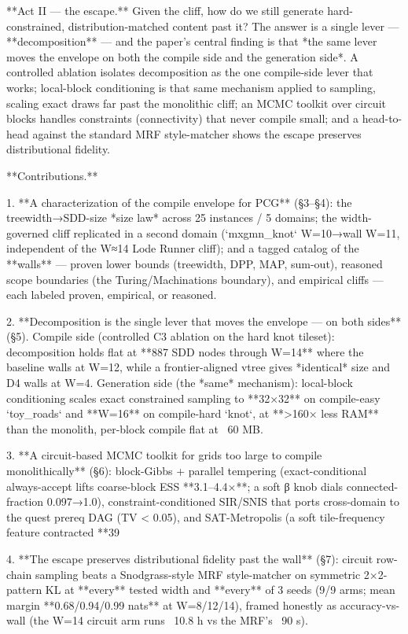 \documentclass[letterpaper]{article} %
\begin{document}
**Act II — the escape.** Given the cliff, how do we still generate hard-constrained,
distribution-matched content past it? The answer is a single lever — **decomposition** — and the
paper's central finding is that *the same lever moves the envelope on both the compile side and the
generation side*. A controlled ablation isolates decomposition as the one compile-side lever that
works; local-block conditioning is that same mechanism applied to sampling, scaling exact draws far
past the monolithic cliff; an MCMC toolkit over circuit blocks handles constraints (connectivity)
that never compile small; and a head-to-head against the standard MRF style-matcher shows the escape
preserves distributional fidelity.

**Contributions.**

1. **A characterization of the compile envelope for PCG** (§3–§4): the treewidth→SDD-size *size law*
   across 25 instances / 5 domains; the width-governed cliff replicated in a second domain
   (`mxgmn_knot` W=10→wall W=11, independent of the W≈14 Lode Runner cliff); and a tagged catalog of
   the **walls** — proven lower bounds (treewidth, DPP, MAP, sum-out), reasoned scope boundaries
   (the Turing/Machinations boundary), and empirical cliffs — each labeled proven, empirical, or
   reasoned.

2. **Decomposition is the single lever that moves the envelope — on both sides** (§5). Compile side
   (controlled C3 ablation on the hard knot tileset): decomposition holds flat at **887 SDD nodes
   through W=14** where the baseline walls at W=12, while a frontier-aligned vtree gives *identical*
   size and D4 walls at W=4. Generation side (the *same* mechanism): local-block conditioning scales
   exact constrained sampling to **32×32** on compile-easy `toy_roads` and **W=16** on compile-hard
   `knot`, at **>160× less RAM** than the monolith, per-block compile flat at ~60 MB.

3. **A circuit-based MCMC toolkit for grids too large to compile monolithically** (§6): block-Gibbs
   + parallel tempering (exact-conditional always-accept lifts coarse-block ESS **3.1–4.4×**; a soft
   β knob dials connected-fraction 0.097→1.0), constraint-conditioned SIR/SNIS that ports
   cross-domain to the quest prereq DAG (TV < 0.05), and SAT-Metropolis (a soft tile-frequency
   feature contracted **39%

4. **The escape preserves distributional fidelity past the wall** (§7): circuit row-chain sampling
   beats a Snodgrass-style MRF style-matcher on symmetric 2×2-pattern KL at **every** tested width
   and **every** of 3 seeds (9/9 arms; mean margin **0.68/0.94/0.99 nats** at W=8/12/14), framed
   honestly as accuracy-vs-wall (the W=14 circuit arm runs ~10.8 h vs the MRF's ~90 s).
\end{document}
